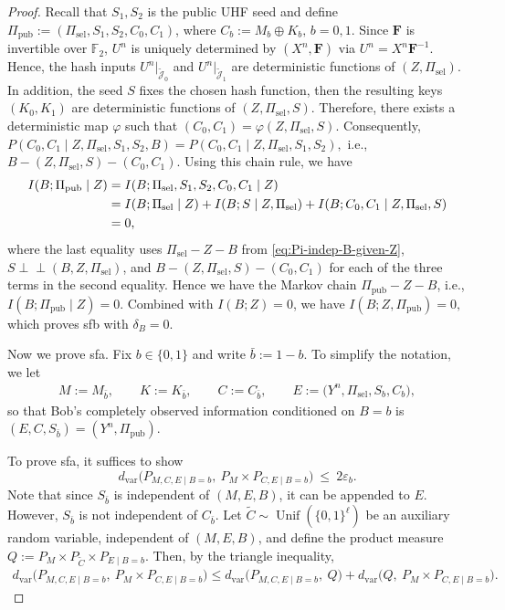 \documentclass[onecolumn]{IEEEtran} %
\newcommand{\bF}{\mathbf F}
\newcommand{\1}{\mathbbm{1}}
\theoremstyle{boldremark}
\DeclareMathOperator{\Unif}{Unif}
\newcommand{\pperp}{\mathrel{\perp\!\!\!\perp}}
\begin{document}
\begin{proof}
Recall that \(S_1,S_2\) is the public UHF seed and define
\(\Pi_{\mathrm{pub}}:=(\Pi_{\mathrm{sel}},S_1,S_2,C_0,C_1)\), where
\(C_b:=M_b\oplus K_b,\,b=0,1\).
Since $\bF$ is invertible over $\mathds{F}_2$, $U^n$ is uniquely determined by $(X^n,\bF)$ via
$U^n = X^n\bF^{-1}$. Hence, the hash inputs $U^n|_{\tilde{\mathcal J}_0}$ and $U^n|_{\tilde{\mathcal J}_1}$
are deterministic functions of $(Z,\Pi_{\mathrm{sel}})$. In addition, the seed \(S\) fixes the chosen hash function, then the resulting keys \((K_0,K_1)\) are deterministic
functions of \((Z,\Pi_{\mathrm{sel}},S)\). Therefore, there exists a deterministic map \(\varphi\) such that
$(C_0,C_1)=\varphi(Z,\Pi_{\mathrm{sel}},S).$ Consequently,
$P(C_0,C_1\mid Z,\Pi_{\mathrm{sel}},S_1,S_2,B)=
P(C_0,C_1\mid Z,\Pi_{\mathrm{sel}},S_1,S_2),$ i.e., \(B-(Z,\Pi_{\mathrm{sel}},S)-(C_0,C_1)\). Using this chain rule, we have
\begin{align}
I(B;\Pi_{\mathrm{pub}}\mid Z)
&= I(B;\Pi_{\mathrm{sel}},S_1,S_2,C_0,C_1\mid Z)\notag\\
&= I(B;\Pi_{\mathrm{sel}}\mid Z)+I(B;S\mid Z,\Pi_{\mathrm{sel}})
   +I(B;C_0,C_1\mid Z,\Pi_{\mathrm{sel}},S)\notag\\
&= 0,
\label{EQ_I_zero_pub}
\end{align}
where the last equality uses \(\Pi_{\mathrm{sel}}-Z-B\) from \eqref{eq:Pi-indep-B-given-Z}, \(S\pperp (B,Z,\Pi_{\mathrm{sel}})\), and
\(B-(Z,\Pi_{\mathrm{sel}},S)-(C_0,C_1)\) for each of the three terms in the second equality. Hence we have the Markov chain \(\Pi_{\mathrm{pub}}-Z-B\), i.e., $I(B;\Pi_{\mathrm{pub}}\mid Z)=0.$ Combined with $I(B;Z)=0$, we have
$I(B;Z,\Pi_{\mathrm{pub}})= 0,$ which proves \gls{sfb} with $\delta_B=0$.



Now we prove \gls{sfa}. Fix \(b\in\{0,1\}\) and write \(\bar b:=1-b\). To simplify the notation, we let
\begin{align}\label{EQ_Def_MKCE}
  M:=M_{\bar b},\qquad
  K:=K_{\bar b},\qquad
  C:=C_{\bar b},\qquad
  E:=\bigl(Y^n,\Pi_{\mathrm{sel}},S_b,C_b\bigr),  
\end{align}
so that Bob's completely observed information conditioned on \(B=b\) is \((E,C,S_{\bar b})=(Y^n,\Pi_{\mathrm{pub}})\).

To prove \gls{sfa}, it suffices to show
\begin{equation}\label{eq:SfA_cond_goal}
d_{\mathrm{var}}\!\big(P_{M,C,E\mid B=b},\ P_M\times P_{C,E\mid B=b}\big)\ \le\ 2\varepsilon_b .
\end{equation}
Note that since $S_{\bar b}$ is independent of $(M,E,B)$, it can be appended to $E$. However, $S_{\bar b}$ is not independent of $C_{\bar b}$. Let \(\widetilde C\sim\Unif(\{0,1\}^{\ell})\) be an auxiliary random variable, independent of \((M,E,B)\),
and define the product measure
\(
Q:=P_M\times P_{\widetilde C}\times P_{E\mid B=b}.
\)
Then, by the triangle inequality,
\begin{align}
d_{\mathrm{var}}\!\big(P_{M,C,E\mid B=b},\ P_M\times P_{C,E\mid B=b}\big)
\le
d_{\mathrm{var}}\!\big(P_{M,C,E\mid B=b},\ Q\big)
+
d_{\mathrm{var}}\!\big(Q,\ P_M\times P_{C,E\mid B=b}\big).
\label{eq:tri_split}
\end{align}



\end{proof}
\end{document}
